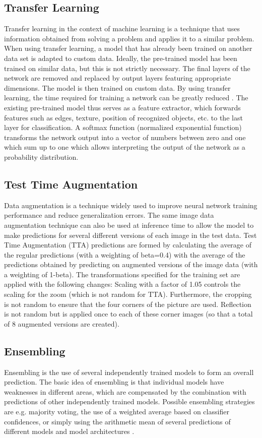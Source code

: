 \documentclass[journal]{IEEEtran}
\begin{document}
\subsection{Transfer Learning}
Transfer learning in the context of machine learning is a technique that uses information obtained from solving a problem and applies it to a similar problem. When using transfer learning, a model that has already been trained on another data set is adapted to custom data. Ideally, the pre-trained model has been trained on similar data, but this is not strictly necessary. The final layers of the network are removed and replaced by output layers featuring  appropriate dimensions. The model is then trained on custom data. By using transfer learning, the time required for training a network can be greatly reduced \cite{pan2008transfer, pan2010survey, hoo2016deep}. The existing pre-trained model thus serves as a feature extractor, which forwards features such as edges, texture, position of recognized objects, etc. to the last layer for classification. A softmax function (normalized exponential function) transforms the network output into a vector of numbers between zero and one which sum up to one which allows interpreting the output of the network as a probability distribution.


\subsection{Test Time Augmentation}
Data augmentation is a technique widely used to improve neural network training performance and reduce generalization errors. The same image data augmentation technique can also be used at inference time to allow the model to make predictions for several different versions of each image in the test data. Test Time Augmentation (TTA) predictions are formed by calculating the average of the regular predictions (with a weighting of beta=0.4) with the average of the predictions obtained by predicting on augmented versions of the image data (with a weighting of 1-beta). The transformations specified for the training set are applied with the following changes: Scaling with a factor of 1.05 controls the scaling for the zoom (which is not random for TTA). Furthermore, the cropping is not random to ensure that the four corners of the picture are used. Reflection is not random but is applied once to each of these corner images (so that a total of 8 augmented versions are created).

\subsection{Ensembling}
Ensembling is the use of several independently trained models to form an overall prediction. The basic idea of ensembling is that individual models have weaknesses in different areas, which are compensated by the combination with predictions of other independently trained models. Possible ensembling strategies are e.g. majority voting, the use of a weighted average based on classifier confidences, or simply using the arithmetic mean of several predictions of different models and model architectures \cite{kowsari2018rmdl}.
\end{document}

